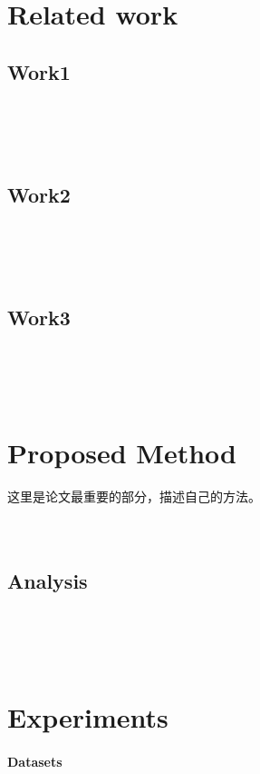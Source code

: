 \documentclass[UTF8]{article} %
\begin{document}
~\\
~\\
~\\

\section{Related work}
\subsection{Work1}

~\\
~\\
~\\

\subsection{Work2}

~\\
~\\
~\\

\subsection{Work3}

~\\
~\\
~\\

\section{Proposed Method}

这里是论文最重要的部分，描述自己的方法。
~\\
~\\
~\\

\subsection{Analysis}\label{sec:analysis}
~\\
~\\
~\\


\section{Experiments}
\paragraph{Datasets} 
\end{document}
